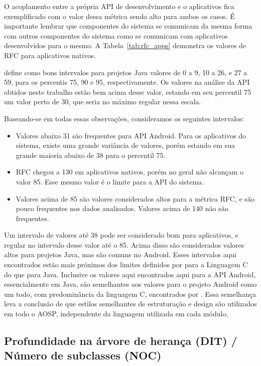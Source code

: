 O acoplamento entre a própria API de desenvolvimento e o aplicativos fica exemplificado com o valor dessa métrica sendo alto para ambos os casos. É importante lembrar que componentes do sistema se comunicam da mesma forma com outros componentes do sistema como se comunicam com aplicativos desenvolvidos para o mesmo. A Tabela~\ref{tab:rfc_apps} demonstra os valores de RFC para aplicativos nativos.

 define como bons intervalos para projetos Java valores de 0 a 9, 10 a 26, e 27 a 59, para os percentis 75, 90 e 95, respectivamente. Os valores na análise da API obtidos neste trabalho estão bem acima desse valor, estando em seu percentil 75 um valor perto de 30, que seria no máximo regular nessa escala.

Baseando-se em todas essas observações, consideramos os seguintes intervalos:

\begin{itemize}
\item Valores abaixo 31 são frequentes para API Android. Para os aplicativos do sistema, existe uma grande variância de valores, porém estando em sua grande maioria abaixo de 38 para o percentil 75.
\item RFC chegou a 130 em aplicativos nativos, porém no geral não alcançam o valor 85. Esse mesmo valor é o limite para a API do sistema.
\item Valores acima de 85 são valores considerados altos para a métrica RFC, e são pouco frequentes nos dados analisados. Valores acima de 140 não são frequentes.
\end{itemize}

Um intervalo de valores até 38 pode ser considerado bom para aplicativos, e regular no intervalo desse valor até o 85. Acima disso são considerados valores altos para projetos Java, mas são comuns no Android. Esses intervalos aqui encontrados estão mais próximos dos limites definidos por  para a Linguagem C do que para Java. Inclusive os valores aqui encontrados aqui para a API Android, essencialmente em Java, são semelhantes aos valores para o projeto Android como um todo, com predominância da linguagem C, encontrados por . Essa semelhança leva a conclusão de que estilos semelhantes de estruturação e design são utilizados em todo o AOSP, independente da linguagem utilizada em cada módulo.

\subsection{Profundidade na árvore de herança (DIT) / Número de subclasses (NOC)}


